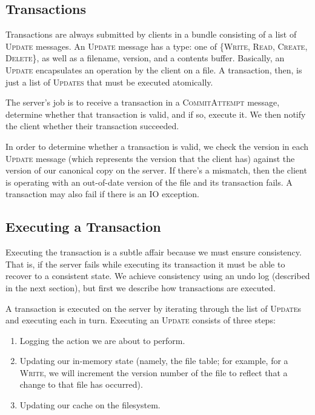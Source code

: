 \documentclass[12pt]{article}
\begin{document}
\subsection{Transactions}

Transactions are always submitted by clients in a bundle consisting of a list of \textsc{Update} messages. An \textsc{Update} message has a type: one of \{\textsc{Write}, \textsc{Read}, \textsc{Create}, \textsc{Delete}\}, as well as a filename, version, and a contents buffer. Basically, an \textsc{Update} encapsulates an operation by the client on a file. A transaction, then, is just a list of \textsc{Updates} that must be executed atomically.

The server's job is to receive a transaction in a \textsc{CommitAttempt} message, determine whether that transaction is valid, and if so, execute it. We then notify the client whether their transaction succeeded.

In order to determine whether a transaction is valid, we check the version in each \textsc{Update} message (which represents the version that the client has) against the version of our canonical copy on the server. If there's a mismatch, then the client is operating with an out-of-date version of the file and its transaction fails. A transaction may also fail if there is an IO exception.

\subsection{Executing a Transaction}

Executing the transaction is a subtle affair because we must ensure consistency. That is, if the server fails while executing its transaction it must be able to recover to a consistent state. We achieve consistency using an undo log (described in the next section), but first we describe how transactions are executed.

A transaction is executed on the server by iterating through the list of \textsc{Update}s and executing each in turn. Executing an \textsc{Update} consists of three steps:

\begin{enumerate}
\item Logging the action we are about to perform.
\item Updating our in-memory state (namely, the file table; for example, for a \textsc{Write}, we will increment the version number of the file to reflect that a change to that file has occurred).
\item Updating our cache on the filesystem.
\end{enumerate}
\end{document}
